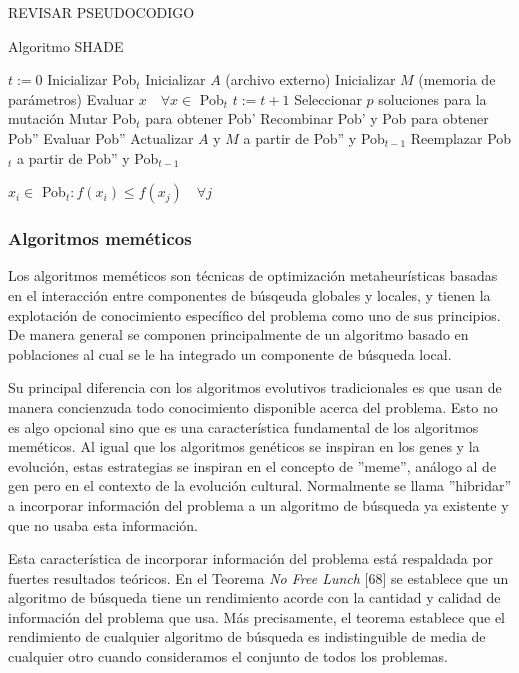 REVISAR PSEUDOCODIGO
\begin{algorithm}
\caption{Algoritmo SHADE}
\label{alg:shade}
	\begin{algorithmic}
		\State $t:=0$
		\State Inicializar Pob$_t$
		\State Inicializar $A$ (archivo externo)
		\State Inicializar $M$ (memoria de parámetros)
		\State Evaluar $x \quad \forall x \in$ Pob$_t$
			\State $t:=t+1$
			\State Seleccionar $p$ soluciones para la mutación
			\State Mutar Pob$_t$ para obtener Pob'
			\State Recombinar Pob' y Pob para obtener Pob''
			\State Evaluar Pob''
			\State Actualizar $A$ y $M$ a partir de Pob'' y Pob$_{t-1}$
			\State Reemplazar Pob$_t$ a partir de Pob'' y Pob$_{t-1}$
		\EndWhile
		
		
		\Return $x_i \in$ Pob$_t : f(x_i) \leq f(x_j) \quad \forall j$
	\end{algorithmic}
\end{algorithm}






\subsubsection{Algoritmos meméticos}

Los algoritmos meméticos son técnicas de optimización metaheurísticas basadas en el interacción entre componentes de búsqeuda globales y locales, y tienen la explotación de conocimiento específico del problema como uno de sus principios. De manera general se componen principalmente de un algoritmo basado en poblaciones al cual se le ha integrado un componente de búsqueda local.

Su principal diferencia con los algoritmos evolutivos tradicionales es que usan de manera concienzuda todo conocimiento disponible acerca del problema. Esto no es algo opcional sino que es una característica fundamental de los algoritmos meméticos. Al igual que los algoritmos genéticos se inspiran en los genes y la evolución, estas estrategias se inspiran en el concepto de ''meme'', análogo al de gen pero en el contexto de la evolución cultural. Normalmente se llama ''hibridar'' a incorporar información del problema a un algoritmo de búsqueda ya existente y que no usaba esta información.

Esta característica de incorporar información del problema está respaldada por fuertes resultados teóricos. En el Teorema \textit{No Free Lunch} [68] se establece que un algoritmo de búsqueda tiene un rendimiento acorde con la cantidad y calidad de información del problema que usa. Más precisamente, el teorema establece que el rendimiento de cualquier algoritmo de búsqueda es indistinguible de media de cualquier otro cuando consideramos el conjunto de todos los problemas. 

